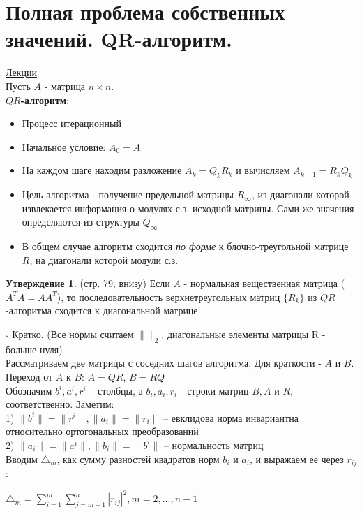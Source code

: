 \documentclass[specialist, subf, href, colorlinks=true, 12pt, times, mtpro, final]{disser}
\theoremstyle{definition}
\newtheorem{state}{Утверждение}[section]
\begin{document}
{    

\section {Полная проблема собственных значений. QR-алгоритм.}
    \hyperlink {lects.79}{Лекции}\\
\noindent Пусть $A$ - матрица $n\times n$.
\\
\textbf{$QR$-алгоритм}:
\begin{itemize}
\item Процесс итерационный
\item Начальное условие: $A_0 = A$
\item На каждом шаге находим разложение $A_k = Q_kR_k$ и  вычисляем $A_{k+1} = R_k Q_k $
\item Цель алгоритма - получение предельной матрицы $R_{\infty}$, из диагонали которой извлекается информация о  модулях с.з. исходной матрицы. Сами же значения определяются из структуры $Q_{\infty}$

\item В общем случае алгоритм сходится \textit{по форме} к блочно-треугольной матрице $R$, на диагонали которой модули с.з.
\end{itemize}
\begin{state} (\hyperlink {lects.79}{стр. 79, внизу})
Если $A$ - нормальная вещественная матрица ($A^TA = AA^T$), то последовательность верхнетреугольных матриц $\{R_k\}$ из $QR$-алгоритма сходится к диагональной матрице.
\end{state}
$\square$ Кратко. (Все нормы считаем $\|\|_2$, диагональные элементы матрицы R - больше нуля)\\
Рассматриваем две матрицы с соседних шагов алгоритма. Для краткости - $A$ и $B$. \\
Переход от $A$ к $B$: $A = QR$, $B = RQ$\\
Обозначим $b^i, a^i, r^i$ \--- столбцы, а $b_i, a_i, r_i$ - строки матриц $B, A$ и $R$, соответственно. 
Заметим:\\
1) $\|b^i\| = \|r^i\|, \|a_i\| = \|r_i\|$ \--- евклидова норма инвариантна относительно ортогональных преобразований\\
2) $\|a_i\| = \|a^i\|, \|b_i\| = \|b^i\|$ \--- нормальность матриц\\
Вводим $\triangle_m$, как сумму разностей квадратов норм $b_i$ и $a_i$, и выражаем ее через $r_{ij}$:
\begin{center}
$\triangle_m = \sum\limits^m_{i=1} \sum\limits^n_{j=m+1} |r_{ij}|^2, m =2, ... , n-1$
\end{center}

}
\end{document}
